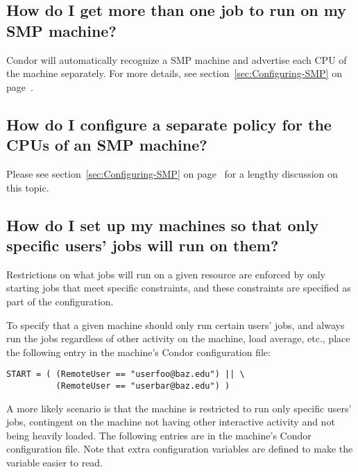 \subsection*{How do I get more than one job to run on my SMP machine?}

Condor will automatically recognize a SMP machine and advertise each
CPU of the machine separately.
For more details, see section~\ref{sec:Configuring-SMP} on
page~\pageref{sec:Configuring-SMP}.

\subsection*{How do I configure a separate policy for the CPUs of an SMP machine?}

Please see section~\ref{sec:Configuring-SMP} on
page~\pageref{sec:Configuring-SMP} for a lengthy discussion on
this topic.

\subsection*{How do I set up my machines so that only specific users' jobs will run on them?}

Restrictions on what jobs will run on a given resource are
enforced by only starting jobs that meet specific constraints,
and these constraints are specified as part of the configuration.

To specify that a given machine should only run certain users' jobs,
and always run the jobs regardless of other activity on the machine,
load average, etc.,
place the following entry in the
machine's Condor configuration file:

\footnotesize
\begin{verbatim}
START = ( (RemoteUser == "userfoo@baz.edu") || \
          (RemoteUser == "userbar@baz.edu") )
\end{verbatim}
\normalsize

A more likely scenario is that the machine is restricted to run
only specific users' jobs, contingent on the machine not having
other interactive activity and not being heavily loaded.
The following entries are in the machine's Condor configuration file. 
Note that extra configuration variables are defined to make 
the  variable easier to read.

